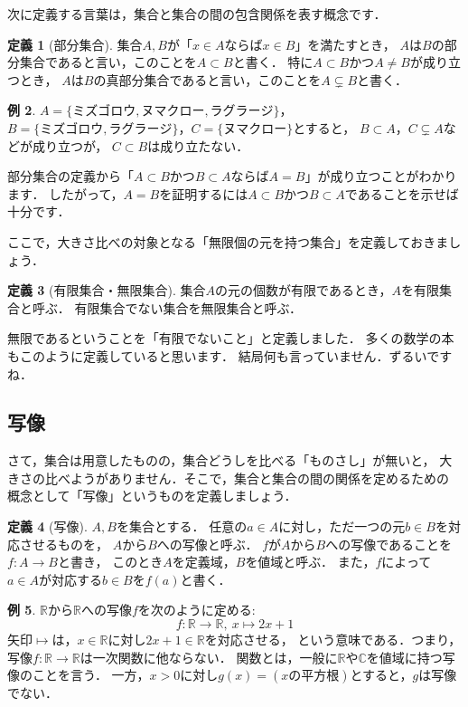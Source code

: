 \documentclass[./main]{subfiles} %
\theoremstyle{definition}
\newtheorem{hamadadefi}{定義}[section]
\newtheorem{hamadaex}[hamadadefi]{例}
\begin{document}
次に定義する言葉は，集合と集合の間の包含関係を表す概念です．

\begin{hamadadefi}[部分集合]
集合$A,B$が「$x\in A$ならば$x\in B$」を満たすとき，
$A$は$B$の部分集合であると言い，このことを$A\subset B$と書く．
特に$A\subset B$かつ$A\neq B$が成り立つとき，
$A$は$B$の真部分集合であると言い，このことを$A\subsetneq B$と書く．
\end{hamadadefi}

\begin{hamadaex}
$A=\{ミズゴロウ, ヌマクロー, ラグラージ\}$，
$B=\{ミズゴロウ, ラグラージ\}$，$C=\{ヌマクロー\}$とすると，
$B\subset A$，$C\subsetneq A$などが成り立つが，
$C\subset B$は成り立たない．
\end{hamadaex}

部分集合の定義から「$A\subset B$かつ$B\subset A$ならば$A=B$」が成り立つことがわかります．
したがって，$A=B$を証明するには$A\subset B$かつ$B\subset A$であることを示せば
十分です．

ここで，大きさ比べの対象となる「無限個の元を持つ集合」を定義しておきましょう．

\begin{hamadadefi}[有限集合・無限集合]
集合$A$の元の個数が有限であるとき，$A$を有限集合と呼ぶ．
有限集合でない集合を無限集合と呼ぶ．
\end{hamadadefi}

無限であるということを「有限でないこと」と定義しました．
多くの数学の本もこのように定義していると思います．
{\footnotesize 結局何も言っていません．ずるいですね．}

\subsection{写像}
さて，集合は用意したものの，集合どうしを比べる「ものさし」が無いと，
大きさの比べようがありません．そこで，集合と集合の間の関係を定めるための
概念として「写像」というものを定義しましょう．

\begin{hamadadefi}[写像]
\label{map}
$A,B$を集合とする．
任意の$a\in A$に対し，ただ一つの元$b\in B$を対応させるものを，
$A$から$B$への写像と呼ぶ．
$f$が$A$から$B$への写像であることを$f\colon A\to B$と書き，
このとき$A$を定義域，$B$を値域と呼ぶ．
また，$f$によって$a\in A$が対応する$b\in B$を$f(a)$と書く．
\end{hamadadefi}

\begin{hamadaex}
\label{mapex}
$\mathbb{R}$から$\mathbb{R}$への写像$f$を次のように定める:
\[
f\colon\mathbb{R}\to\mathbb{R},\ x\mapsto 2x+1
\]
矢印$\mapsto$は，$x\in\mathbb{R}$に対し$2x+1\in\mathbb{R}$を対応させる，
という意味である．つまり，写像$f\colon\mathbb{R}\to\mathbb{R}$は一次関数に他ならない．
関数とは，一般に$\mathbb{R}$や$\mathbb{C}$を値域に持つ写像のことを言う．
一方，$x>0$に対し$g(x)=(xの平方根)$とすると，$g$は写像でない．
\end{hamadaex}
\end{document}
